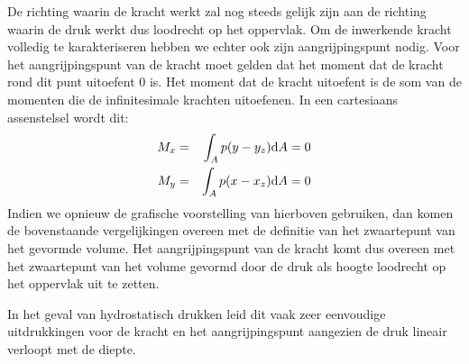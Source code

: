 De richting waarin de kracht werkt zal nog steeds gelijk zijn aan de richting waarin de druk werkt dus loodrecht op het oppervlak. Om de inwerkende kracht volledig te karakteriseren hebben we echter ook zijn aangrijpingspunt nodig. Voor het aangrijpingspunt van de kracht moet gelden dat het moment dat de kracht rond dit punt uitoefent 0 is. Het moment dat de kracht uitoefent is de som van de momenten die de infinitesimale krachten uitoefenen. In een cartesiaans assenstelsel wordt dit:
\begin{eqnarray}
	M_x &=& \int_A  p (y-y_z)  \mathrm{d} A = 0 \\
	M_y &=& \int_A  p (x-x_z)  \mathrm{d} A = 0
\end{eqnarray}
Indien we opnieuw de grafische voorstelling van hierboven gebruiken, dan komen de bovenstaande vergelijkingen overeen met de definitie van het zwaartepunt van het gevormde volume. Het aangrijpingspunt van de kracht komt dus overeen met het zwaartepunt van het volume gevormd door de druk als hoogte loodrecht op het oppervlak uit te zetten.

In het geval van hydrostatisch drukken leid dit vaak zeer eenvoudige uitdrukkingen voor de kracht en het aangrijpingspunt aangezien de druk lineair verloopt met de diepte.

